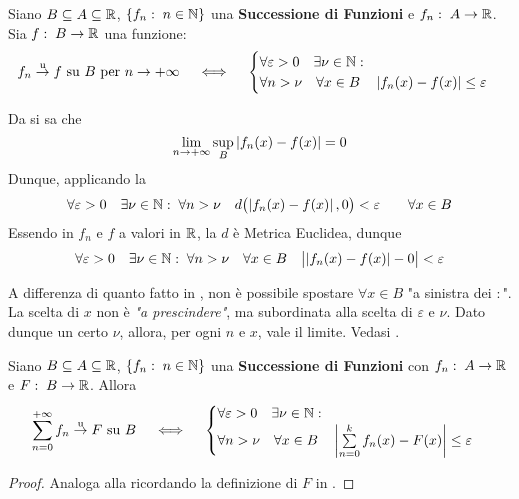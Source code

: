 \begin{proposition}
	\label{prop:conv_unif_lim_succ}
	Siano $B \subseteq A \subseteq \mathbb{R}$, $\left\{f_n:\; n \in \mathbb{N}\right\}$ una \textbf{Successione di Funzioni} e $f_n:\; A \to \mathbb{R}$. Sia $f:\; B \to \mathbb{R}$ una funzione:
	\[
		f_n \overset{\text{u}}{\to} f \text{ su } B \text{ per } n \to +\infty
		\quad \iff \quad
		\begin{cases}
			\forall \varepsilon > 0 \quad \exists \nu \in \mathbb{N}:\\
			\forall n > \nu \quad \forall x \in B \quad \left|f_n(x) - f(x)\right| \leq \varepsilon
		\end{cases}
	\]
	\begin{solution}
		Da  si sa che
		\[\lim\limits_{n \to +\infty} \sup\limits_{B} \left|f_n(x) - f(x)\right| = 0\]
		Dunque, applicando la 
		\[
			\forall \varepsilon > 0 \quad \exists\nu\in\mathbb{N}:\; \forall n > \nu \quad d \bigl( \left|f_n(x) - f(x)\right|, 0 \bigr) < \varepsilon  \qquad \forall x \in B
		\]
		Essendo in $f_n$ e $f$ a valori in $\mathbb{R}$, la $d$ è Metrica Euclidea, dunque
		\[
			\forall \varepsilon > 0 \quad \exists\nu\in\mathbb{N}:\; \forall n > \nu \quad \forall x \in B \quad \bigl| \left|f_n(x) - f(x)\right| - 0 \bigr| < \varepsilon
		\]
		\begin{note}
			A differenza di quanto fatto in , non è possibile spostare $\forall x \in B$ "a sinistra dei $:$". La scelta di $x$ non è \textit{"a prescindere"}, ma subordinata alla scelta di $\varepsilon$ e $\nu$. Dato dunque un certo $\nu$, allora, per ogni $n$ e $x$, vale il limite. Vedasi .
		\end{note}
	\end{solution}
\end{proposition}
\begin{proposition}
	Siano $B \subseteq A \subseteq \mathbb{R}$, $\left\{f_n:\; n \in \mathbb{N}\right\}$ una \textbf{Successione di Funzioni} con $f_n:\; A \to \mathbb{R}$ e $F:\; B \to \mathbb{R}$. Allora
	\[
		\sum\limits_{n = 0}^{+\infty} f_n \overset{\text{u}}{\to} F \text{ su } B
		\quad \iff \quad
		\begin{cases}
			\forall \varepsilon > 0 \quad \exists \nu \in \mathbb{N}:\\
			\forall n > \nu \quad \forall x \in B \quad \left|\sum\limits_{n = 0}^{k} f_n(x) - F(x)\right| \leq \varepsilon
		\end{cases}
	\]
	\begin{proof}
		Analoga alla  ricordando la definizione di $F$ in .
	\end{proof}
\end{proposition}
